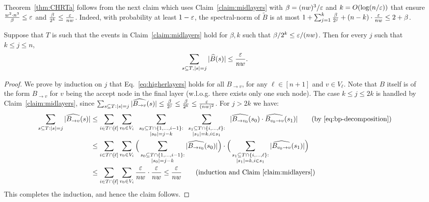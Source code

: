 Theorem~\ref{thm:CHRTa} follows from the next claim which uses Claim~\ref{claim:midlayers} with $\beta=(nw)^3 /\varepsilon$ and $k =  O(\log (n/\varepsilon))$ that ensure $\frac{w^2 \cdot n^3}{\beta}\leq \varepsilon$ and  $\frac{\beta}{2^k}\leq \frac{\varepsilon}{nw}$.
Indeed, with probability at least $1-\varepsilon$, the spectral-norm of $\tilde{B}$ is at most $1+\sum_{j=1}^{k}{\frac{\beta}{2^j}} + (n-k) \cdot \frac{\varepsilon}{nw} \le 2+\beta$.
%
\begin{claim}
Suppose that $T$ is such that the events in Claim~\ref{claim:midlayers} hold for $\beta, k$ such that $\beta/2^k \le \varepsilon/(nw)$. 
Then for every $j$ such that $k\le j \le n$, 
\begin{equation}\label{eq:higherlayers}\sum_{s \subseteq T, |s|=j}{ |\widehat{B}(s)|} \le \frac{\varepsilon}{nw}.\end{equation}
\end{claim}
\begin{proof}
We  prove by induction on $j$ that Eq.~\eqref{eq:higherlayers} holds for all $B_{\to v}$, for any $\ell\in [n+1]$ and $v\in V_\ell$. Note that $B$ itself is of the form $B_{\to v}$ for $v$ being the accept node in the final layer (w.l.o.g. there exists only one such node).   
The case $k \le j \le 2k$ is handled by Claim~\ref{claim:midlayers}, since $\sum_{s\subseteq T:|s|=j}|\widehat{B_{\to v}}(s)|  \le	 \frac{\beta}{2^j} \le \frac{\beta}{2^k} \le \frac{\varepsilon}{(nw)^2}$. 
For $j > 2k$ we have: 
\begin{align*}
\sum_{s\subseteq T: |s|=j} |\widehat{B_{\to v}}(s)| 
&\le \sum_{i\in T \cap [\ell]} \sum_{v_0\in V_i} \;\;\sum_{\substack{s_0\subseteq T \cap \{1,\ldots,i-1\}:\\ |s_0|=j-k}}\;\;\sum_{\substack{s_1\subseteq T \cap \{i,\ldots, \ell \}:\\ |s_1|=k, i\in s_1}}\;\; \vert \widehat{B_{\to v_0}}(s_0)\cdot \widehat{B_{v_0\to v}}(s_1)\vert \tag{by \cref{eq:bp-decomposition}}\\
& \le \sum_{i\in T \cap [\ell]} \sum_{v_0\in V_i} \Big(\sum_{\substack{s_0\subseteq T \cap \{1,\ldots,i-1\}:\\ |s_0|=j-k}}\vert\widehat{B_{\to v_0}}(s_0)\vert\Big)\cdot \Big(\sum_{\substack{s_1\subseteq T \cap \{i,\ldots, \ell\}:\\ |s_1|=k, i\in s_1}} \vert \widehat{ B_{v_0\to v}}(s_1)\vert \Big) \\
&\le \sum_{i\in T \cap [\ell]} \sum_{v_0\in V_i} 
\frac{\eps}{nw}
\cdot 
\frac{\eps}{nw}
\le \frac{\eps}{nw} \tag{induction and Claim~\ref{claim:midlayers}}
\end{align*}
This completes the induction, and hence the claim follows.
\end{proof}



